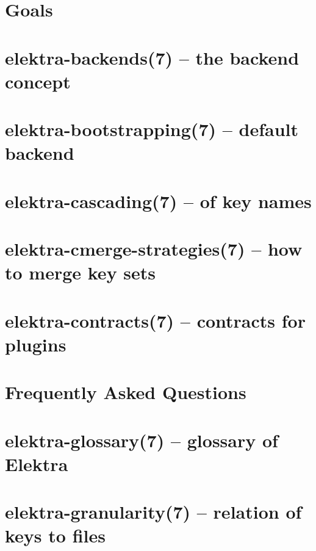 \let\mypdfximage\pdfximage\def\pdfximage{\immediate\mypdfximage}\documentclass[twoside]{book}
\newcommand{\+}{\discretionary{\mbox{\scriptsize$\hookleftarrow$}}{}{}}
\begin{document}
\chapter{Goals}
\label{doc_GOALS_md}

\chapter{elektra-\/backends(7) -- the backend concept}
\label{doc_help_elektra-backends_md}

\chapter{elektra-\/bootstrapping(7) -- default backend}
\label{doc_help_elektra-bootstrapping_md}

\chapter{elektra-\/cascading(7) -- of key names}
\label{doc_help_elektra-cascading_md}

\chapter{elektra-\/cmerge-\/strategies(7) -- how to merge key sets}
\label{doc_help_elektra-cmerge-strategy_md}

\chapter{elektra-\/contracts(7) -- contracts for plugins}
\label{doc_help_elektra-contracts_md}

\chapter{Frequently Asked Questions}
\label{doc_help_elektra-faq_md}

\chapter{elektra-\/glossary(7) -- glossary of Elektra}
\label{doc_help_elektra-glossary_md}

\chapter{elektra-\/granularity(7) -- relation of keys to files}
\label{doc_help_elektra-granularity_md}

\end{document}
